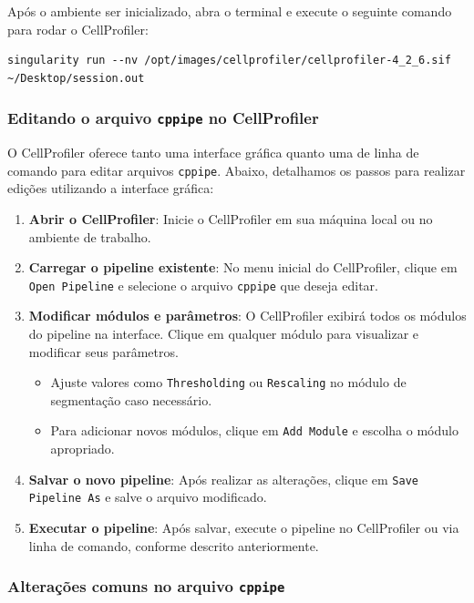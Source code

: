 \documentclass{article}
\begin{document}
Após o ambiente ser inicializado, abra o terminal e execute o seguinte comando para rodar o CellProfiler:  

\begin{verbatim}  
singularity run --nv /opt/images/cellprofiler/cellprofiler-4_2_6.sif ~/Desktop/session.out  
\end{verbatim}  



\subsubsection{Editando o arquivo \texttt{cppipe} no CellProfiler}

O CellProfiler oferece tanto uma interface gráfica quanto uma de linha de comando para editar arquivos \texttt{cppipe}. Abaixo, detalhamos os passos para realizar edições utilizando a interface gráfica:

\begin{enumerate}
    \item \textbf{Abrir o CellProfiler}: Inicie o CellProfiler em sua máquina local ou no ambiente de trabalho.
    \item \textbf{Carregar o pipeline existente}: No menu inicial do CellProfiler, clique em 
    \texttt{Open Pipeline} e selecione o arquivo \texttt{cppipe} que deseja editar.
    \item \textbf{Modificar módulos e parâmetros}: O CellProfiler exibirá todos os módulos do pipeline na interface. Clique em qualquer módulo para visualizar e modificar seus parâmetros.
    \begin{itemize}
        \item Ajuste valores como \texttt{Thresholding} ou \texttt{Rescaling} no módulo de segmentação caso necessário.
        \item Para adicionar novos módulos, clique em \texttt{Add Module} e escolha o módulo apropriado.
    \end{itemize}
    \item \textbf{Salvar o novo pipeline}: Após realizar as alterações, clique em \texttt{Save Pipeline As} e salve o arquivo modificado.
    \item \textbf{Executar o pipeline}: Após salvar, execute o pipeline no CellProfiler ou via linha de comando, conforme descrito anteriormente.
\end{enumerate}

\subsubsection{Alterações comuns no arquivo \texttt{cppipe}}
\end{document}
